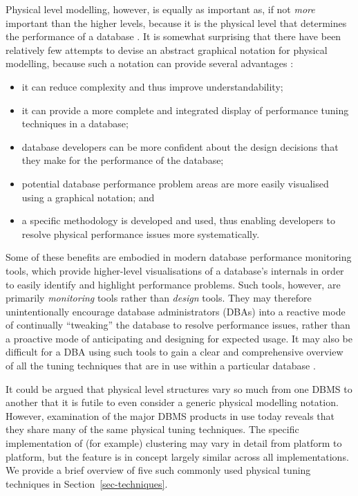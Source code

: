 \documentclass{CRPITStyle}
\begin{document}
Physical level modelling, however, is equally as important as, if not
\emph{more} important than the higher levels, because it is the physical
level that determines the performance of a database \cite{BeDa-P-2003}.
It is somewhat surprising that there have been relatively few attempts
to devise an abstract graphical notation for physical modelling, because
such a notation can provide several advantages
\cite{BeDa-P-1992-PDD,Conn-TM-2002,Tuft-ER-1997,Will-J-1992}:
\begin{itemize}

	\item it can reduce complexity and thus improve understandability;

	\item it can provide a more complete and integrated display of
	performance tuning techniques in a database;

	\item database developers can be more confident about the design
	decisions that they make for the performance of the database;

	\item potential database performance problem areas are more easily
	visualised using a graphical notation; and

	\item a specific methodology is developed and used, thus enabling
	developers to resolve physical performance issues more
	systematically.

\end{itemize}

Some of these benefits are embodied in modern database performance
monitoring tools, which provide higher-level visualisations of a
database's internals in order to easily identify and highlight
performance problems. Such tools, however, are primarily
\emph{monitoring} tools rather than \emph{design} tools. They may
therefore unintentionally encourage database administrators (DBAs) into
a reactive mode of continually ``tweaking'' the database to resolve
performance issues, rather than a proactive mode of anticipating and
designing for expected usage. It may also be difficult for a DBA using
such tools to gain a clear and comprehensive overview of all the tuning
techniques that are in use within a particular database
\cite{Core-MJ-1997-OracleDW}.

It could be argued that physical level structures vary so much from one
DBMS to another that it is futile to even consider a generic physical
modelling notation. However, examination of the major DBMS products in
use today reveals that they share many of the same physical tuning
techniques. The specific implementation of (for example) clustering may
vary in detail from platform to platform, but the feature is in concept
largely similar across all implementations. We provide a brief overview
of five such commonly used physical tuning techniques in
Section~\ref{sec-techniques}.
\end{document}
